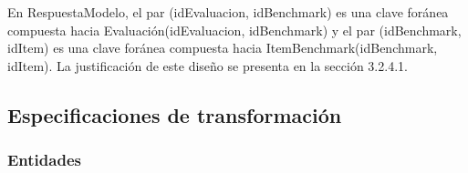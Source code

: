 \documentclass[12pt,a4paper]{article}
\begin{document}
En RespuestaModelo, el par (idEvaluacion, idBenchmark) es una clave foránea compuesta hacia Evaluación(idEvaluacion, idBenchmark) y el par (idBenchmark, idItem) es una clave foránea compuesta hacia ItemBenchmark(idBenchmark, idItem). La justificación de este diseño se presenta en la sección 3.2.4.1.

\subsection{Especificaciones de transformación}

\subsubsection{Entidades}
\end{document}

